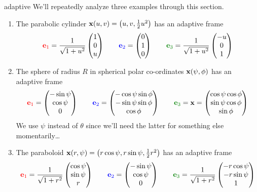 \begin{examples}{}{adaptive}
	We'll repeatedly analyze three examples through this section.
	\begin{enumerate}\itemsep1pt
	  \item The parabolic cylinder ${\mathbf{x}}(u,v)=\bigl(u,v,\frac 12u^2\bigr)$ has an adaptive frame
		\[
			\textcolor{red}{\ve_1}=\frac 1{\sqrt{1+u^2}}\threevec 10u\qquad \textcolor{blue}{\ve_2}=\threevec 010\qquad \textcolor{Green}{\ve_3}=\frac 1{\sqrt{1+u^2}}\threevec{-u}01
		\]
		\item The sphere of radius $R$ in spherical polar co-ordinates ${\mathbf{x}}(\psi,\phi)$ has an adaptive frame
		\[
			\textcolor{red}{\ve_1}=\threevec{-\sin\psi}{\cos\psi}0\qquad \textcolor{blue}{\ve_2}=\threevec{-\cos\psi\sin\phi}{-\sin\psi\sin\phi}{\cos\phi}\qquad \textcolor{Green}{\ve_3}=\vx=\threevec{\cos\psi\cos\phi}{\sin\psi\cos\phi}{\sin\phi}
		\]
		We use $\psi$ instead of $\theta$ since we'll need the latter for something else momentarily\ldots
		\item The paraboloid ${\mathbf{x}}(r,\psi)=\bigl(r\cos\psi,r\sin\psi,\frac 12r^2\bigr)$ has an adaptive frame
		\[
			\textcolor{red}{\ve_1}=\frac 1{\sqrt{1+r^2}}\threevec{\cos\psi}{\sin\psi}{r}\qquad \textcolor{blue}{\ve_2}=\threevec{-\sin\psi}{\cos\psi}0\qquad \textcolor{Green}{\ve_3}=\frac 1{\sqrt{1+r^2}}\threevec{-r\cos\psi}{-r\sin\psi}1
		\]
	\end{enumerate}


\end{examples}

